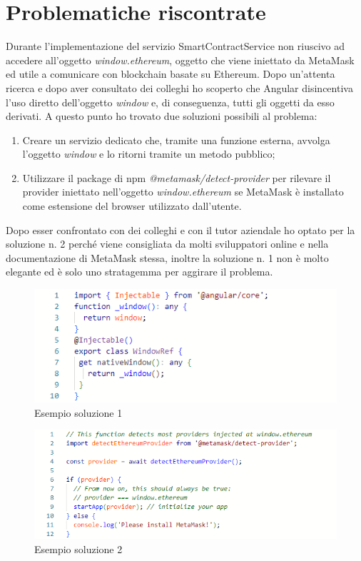 \section{Problematiche riscontrate}
Durante l'implementazione del servizio SmartContractService non riuscivo ad accedere all'oggetto \textit{window.ethereum}, oggetto che viene iniettato da MetaMask ed utile a comunicare con blockchain basate su Ethereum. Dopo un'attenta ricerca e dopo aver consultato dei colleghi ho scoperto che Angular disincentiva l'uso diretto dell'oggetto \textit{window} e, di conseguenza, tutti gli oggetti da esso derivati. A questo punto ho trovato due soluzioni possibili al problema:
\begin{enumerate}
    \item Creare un servizio dedicato che, tramite una funzione esterna, avvolga l'oggetto \textit{window} e lo ritorni tramite un metodo pubblico;
    \item Utilizzare il package di npm \textit{@metamask/detect-provider} per rilevare il provider iniettato nell'oggetto \textit{window.ethereum} se MetaMask è installato come estensione del browser utilizzato dall'utente.
\end{enumerate}
Dopo esser confrontato con dei colleghi e con il tutor aziendale ho optato per la soluzione n. 2 perché viene consigliata da molti sviluppatori online e nella documentazione di MetaMask stessa, inoltre la soluzione n. 1 non è molto elegante ed è solo uno stratagemma per aggirare il problema.\cite{site:ethereum-provider}

\begin{figure}[!h] 
    \centering 
    \includegraphics[width=0.9\columnwidth]{immagini/soluzione1.png} 
    \caption{Esempio soluzione 1}
\end{figure}

\begin{figure}[!h] 
    \centering 
    \includegraphics[width=0.9\columnwidth]{immagini/soluzione2.png} 
    \caption{Esempio soluzione 2}
\end{figure}